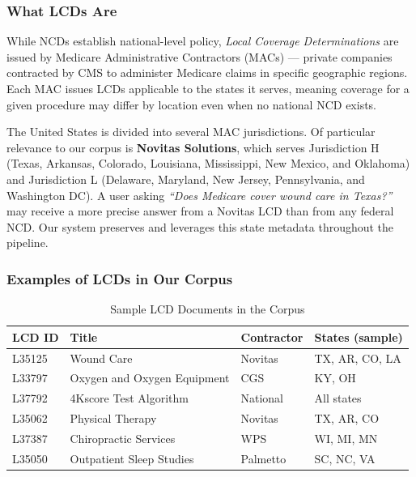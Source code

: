 \documentclass[10pt, letterpaper]{article}
\begin{document}
\subsubsection{What LCDs Are}
 
While NCDs establish national-level policy, \textit{Local Coverage Determinations} are
issued by Medicare Administrative Contractors (MACs) --- private companies contracted
by CMS to administer Medicare claims in specific geographic regions. Each MAC issues
LCDs applicable to the states it serves, meaning coverage for a given procedure may
differ by location even when no national NCD exists.
 
The United States is divided into several MAC jurisdictions. Of particular relevance to
our corpus is \textbf{Novitas Solutions}, which serves Jurisdiction H (Texas, Arkansas,
Colorado, Louisiana, Mississippi, New Mexico, and Oklahoma) and Jurisdiction L
(Delaware, Maryland, New Jersey, Pennsylvania, and Washington DC). A user asking
\textit{``Does Medicare cover wound care in Texas?''} may receive a more precise answer
from a Novitas LCD than from any federal NCD. Our system preserves and leverages this
state metadata throughout the pipeline.
 
\subsubsection{Examples of LCDs in Our Corpus}
 
\begin{table}[h]
\centering
\caption{Sample LCD Documents in the Corpus}
\label{tab:lcdsample}
\begin{tabular}{@{}llll@{}}
\toprule
\textbf{LCD ID} & \textbf{Title} & \textbf{Contractor} & \textbf{States (sample)} \\
\midrule
L35125 & Wound Care                  & Novitas  & TX, AR, CO, LA \\
L33797 & Oxygen and Oxygen Equipment & CGS      & KY, OH \\
L37792 & 4Kscore Test Algorithm      & National & All states \\
L35062 & Physical Therapy            & Novitas  & TX, AR, CO \\
L37387 & Chiropractic Services       & WPS      & WI, MI, MN \\
L35050 & Outpatient Sleep Studies    & Palmetto & SC, NC, VA \\
\bottomrule
\end{tabular}
\end{table}
 
\end{document}
